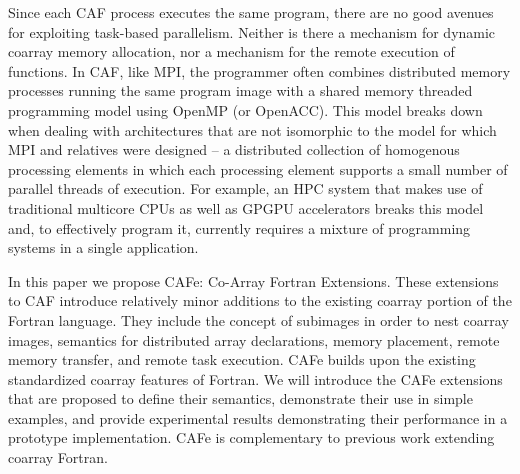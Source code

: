 Since each CAF process executes the same program, there are no good avenues for exploiting
task-based parallelism.  Neither is there a mechanism for dynamic coarray memory
allocation, nor a mechanism for the remote execution of functions.  In CAF, like MPI, the
programmer often combines distributed memory processes running the same program image with a
shared memory threaded programming model using OpenMP (or OpenACC).  This model breaks down
when dealing with architectures that are not isomorphic to the model for which MPI and
relatives were designed -- a distributed collection of homogenous processing elements in
which each processing element supports a small number of parallel threads of execution.  For
example, an HPC system that makes use of traditional multicore CPUs as well as GPGPU accelerators
breaks this model and, to effectively program it, currently requires a mixture of programming
systems in a single application.

In this paper we propose CAFe: Co-Array Fortran Extensions.  These extensions to CAF introduce
relatively minor additions to the existing coarray portion of the Fortran language.  They
include the concept of subimages in order to nest coarray images, semantics for distributed
array declarations, memory placement, remote memory transfer, and remote task execution.  CAFe
builds upon the existing standardized coarray features of Fortran.  We will introduce the
CAFe extensions that are proposed to define their semantics, demonstrate their use in simple
examples, and provide experimental results demonstrating their performance in a prototype implementation.
CAFe is complementary to
previous work extending coarray Fortran\cite{mellor-crummey:2009:caf2,jin:2011:caf2}.



